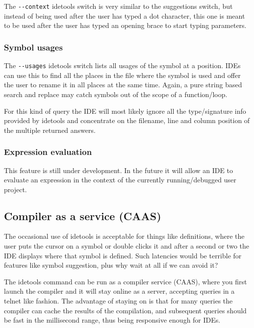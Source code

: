 The \texttt{-\/-context} idetools switch is very similar to the
suggestions switch, but instead of being used after the user has typed a
dot character, this one is meant to be used after the user has typed an
opening brace to start typing parameters.

\hypertarget{symbol-usages}{%
\subsubsection{Symbol usages}\label{symbol-usages}}

The \texttt{-\/-usages} idetools switch lists all usages of the symbol
at a position. IDEs can use this to find all the places in the file
where the symbol is used and offer the user to rename it in all places
at the same time. Again, a pure string based search and replace may
catch symbols out of the scope of a function/loop.

For this kind of query the IDE will most likely ignore all the
type/signature info provided by idetools and concentrate on the
filename, line and column position of the multiple returned answers.

\hypertarget{expression-evaluation}{%
\subsubsection{Expression evaluation}\label{expression-evaluation}}

This feature is still under development. In the future it will allow an
IDE to evaluate an expression in the context of the currently
running/debugged user project.

\hypertarget{compiler-as-a-service-caas}{%
\subsection{Compiler as a service
(CAAS)}\label{compiler-as-a-service-caas}}

The occasional use of idetools is acceptable for things like
definitions, where the user puts the cursor on a symbol or double clicks
it and after a second or two the IDE displays where that symbol is
defined. Such latencies would be terrible for features like symbol
suggestion, plus why wait at all if we can avoid it?

The idetools command can be run as a compiler service (CAAS), where you
first launch the compiler and it will stay online as a server, accepting
queries in a telnet like fashion. The advantage of staying on is that
for many queries the compiler can cache the results of the compilation,
and subsequent queries should be fast in the millisecond range, thus
being responsive enough for IDEs.

